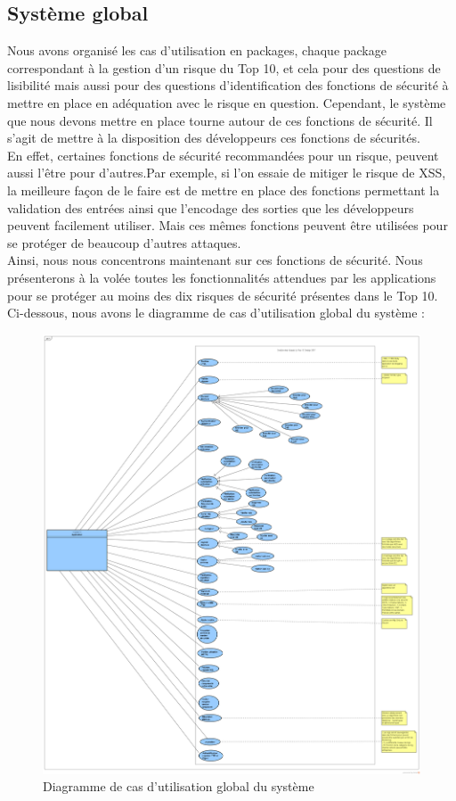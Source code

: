 \subsection{Système global}
Nous avons organisé les cas d'utilisation en packages, chaque package correspondant à la gestion d'un risque du Top 10, et cela pour des questions de lisibilité mais aussi pour des questions d'identification des fonctions de sécurité à mettre en place en adéquation avec le risque en question. Cependant, le système que nous devons mettre en place tourne autour de ces fonctions de sécurité. Il s'agit de mettre à la disposition des développeurs ces fonctions de sécurités. \\
En effet, certaines fonctions de sécurité recommandées pour un risque, peuvent aussi l'être pour d'autres.Par exemple, si l'on essaie de mitiger le risque de XSS, la meilleure façon de le faire est de mettre en place des fonctions permettant la validation des entrées ainsi que l'encodage des sorties que les développeurs peuvent facilement utiliser. Mais ces mêmes fonctions peuvent être utilisées pour se protéger de beaucoup  d’autres attaques. \\
Ainsi, nous nous concentrons maintenant sur ces fonctions de sécurité. Nous présenterons à la volée toutes les fonctionnalités attendues par les applications pour se protéger au moins des dix risques de sécurité présentes dans le Top 10.\\
Ci-dessous, nous avons le diagramme de cas d'utilisation global du système :
\begin{figure}[H]
	\centering
	\includegraphics[width=1.0\textwidth,height=0.95\textheight]{fig/Global-use-case-diagram.png}
	\caption{Diagramme de cas d'utilisation global du système}
	\label{fig:7.12}
\end{figure}
